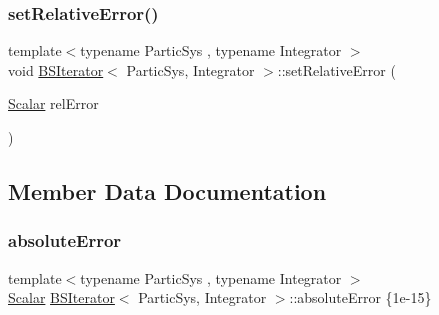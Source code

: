 \mbox{\label{class_b_s_iterator_ada9b6cc673e297135646699d581fcdc7}} 
\subsubsection{\texorpdfstring{set\+Relative\+Error()}{setRelativeError()}}
{\footnotesize\ttfamily template$<$typename Partic\+Sys , typename Integrator $>$ \\
void \mbox{\hyperlink{class_b_s_iterator}{B\+S\+Iterator}}$<$ Partic\+Sys, Integrator $>$\+::set\+Relative\+Error (\begin{DoxyParamCaption}\item[{\mbox{\hyperlink{class_b_s_iterator_a7857f8ff9032955ea4dcc22cd18ca7a1}{Scalar}}}]{rel\+Error }\end{DoxyParamCaption})\hspace{0.3cm}{\ttfamily [inline]}}



\subsection{Member Data Documentation}
\mbox{\label{class_b_s_iterator_a8948aa04b0ec390d43eb3d1f0a2efb03}} 
\subsubsection{\texorpdfstring{absolute\+Error}{absoluteError}}
{\footnotesize\ttfamily template$<$typename Partic\+Sys , typename Integrator $>$ \\
\mbox{\hyperlink{class_b_s_iterator_a7857f8ff9032955ea4dcc22cd18ca7a1}{Scalar}} \mbox{\hyperlink{class_b_s_iterator}{B\+S\+Iterator}}$<$ Partic\+Sys, Integrator $>$\+::absolute\+Error \{1e-\/15\}\hspace{0.3cm}{\ttfamily [private]}}

\mbox{\label{class_b_s_iterator_a28f6cc2fd6bfd554f85225492f4210b7}} 
